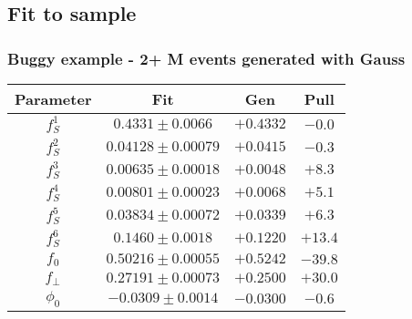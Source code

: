 \documentclass[aspectratio=43,9pt]{beamer}
\begin{document}
\subsection{Fit to sample} %
\begin{frame} %
  \frametitle{Buggy example - 2+ M events generated with Gauss}
  
  \centering
  \begin{tabular}{cccc}
    \hline
    Parameter  &                   Fit  &      Gen  &  Pull \\
    \hline
    $                       f_S^{1} $&$         0.4331 \pm 0.0066 $&$ +0.4332 $&$ -0.0 $\\
    $                       f_S^{2} $&$       0.04128 \pm 0.00079 $&$ +0.0415 $&$ -0.3 $\\
    $                       f_S^{3} $&$       0.00635 \pm 0.00018 $&$ +0.0048 $&$ +8.3 $\\
    $                       f_S^{4} $&$       0.00801 \pm 0.00023 $&$ +0.0068 $&$ +5.1 $\\
    $                       f_S^{5} $&$       0.03834 \pm 0.00072 $&$ +0.0339 $&$ +6.3 $\\
    $                       f_S^{6} $&$         0.1460 \pm 0.0018 $&$ +0.1220 $&$ +13.4 $\\
    $                           f_0 $&$       0.50216 \pm 0.00055 $&$ +0.5242 $&$ -39.8 $\\
    $                     f_{\perp} $&$       0.27191 \pm 0.00073 $&$ +0.2500 $&$ +30.0 $\\
    $                        \phi_0 $&$        -0.0309 \pm 0.0014 $&$ -0.0300 $&$ -0.6 $\\

\end{tabular}
\end{frame}
\end{document}
